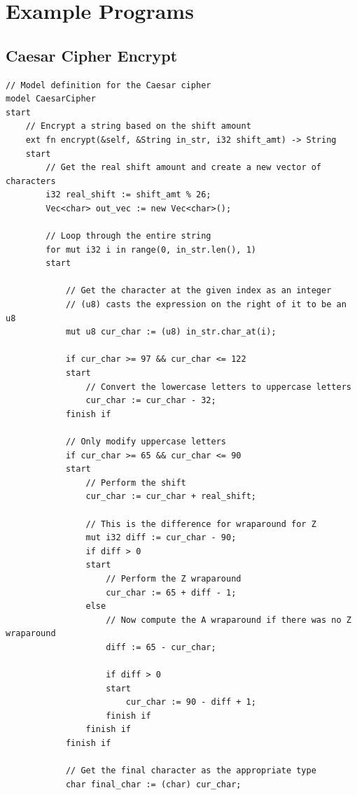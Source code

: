 \documentclass[letterpaper, 10pt, DIV=13]{scrartcl}
\numberwithin{equation}{section}
\numberwithin{figure}{section}
\numberwithin{table}{section}
\begin{document}
\section{Example Programs}
\subsection{Caesar Cipher Encrypt}
\begin{lstlisting}[caption = CaesarCipher.rez, frame = single, nolol]
// Model definition for the Caesar cipher
model CaesarCipher
start
    // Encrypt a string based on the shift amount
    ext fn encrypt(&self, &String in_str, i32 shift_amt) -> String
    start
        // Get the real shift amount and create a new vector of characters
        i32 real_shift := shift_amt % 26;
        Vec<char> out_vec := new Vec<char>();

        // Loop through the entire string
        for mut i32 i in range(0, in_str.len(), 1)
        start
            
            // Get the character at the given index as an integer
            // (u8) casts the expression on the right of it to be an u8
            mut u8 cur_char := (u8) in_str.char_at(i);

            if cur_char >= 97 && cur_char <= 122
            start
                // Convert the lowercase letters to uppercase letters
                cur_char := cur_char - 32;
            finish if

            // Only modify uppercase letters
            if cur_char >= 65 && cur_char <= 90
            start
                // Perform the shift
                cur_char := cur_char + real_shift;

                // This is the difference for wraparound for Z
                mut i32 diff := cur_char - 90;
                if diff > 0
                start
                    // Perform the Z wraparound
                    cur_char := 65 + diff - 1;
                else
                    // Now compute the A wraparound if there was no Z wraparound
                    diff := 65 - cur_char;

                    if diff > 0
                    start
                        cur_char := 90 - diff + 1;
                    finish if
                finish if
            finish if
            
            // Get the final character as the appropriate type
            char final_char := (char) cur_char;


\end{lstlisting}
\end{document}
